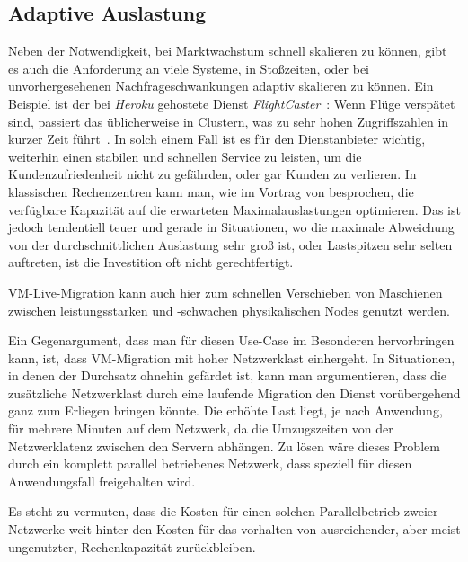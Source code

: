 \subsection{Adaptive Auslastung}
\label{sec:adaptive-auslastung}
Neben der Notwendigkeit, bei Marktwachstum schnell skalieren zu
können, gibt es auch die Anforderung an viele Systeme, in Stoßzeiten,
oder bei unvorhergesehenen Nachfrageschwankungen adaptiv skalieren zu
können. Ein Beispiel ist der bei \emph{Heroku} gehostete Dienst
\emph{FlightCaster}~\cite{flightcaster}: Wenn Flüge verspätet sind,
passiert das üblicherweise in Clustern, was zu sehr hohen
Zugriffszahlen in kurzer Zeit führt~\cite{flightcaster_success}. In
solch einem Fall ist es für den Dienstanbieter wichtig, weiterhin
einen stabilen und schnellen Service zu leisten, um die
Kundenzufriedenheit nicht zu gefährden, oder gar Kunden zu
verlieren. In klassischen Rechenzentren kann man, wie im Vortrag von
\cite{benchmarkingthecloud} besprochen, die verfügbare Kapazität auf
die erwarteten Maximalauslastungen optimieren. Das ist jedoch
tendentiell teuer und gerade in Situationen, wo die maximale
Abweichung von der durchschnittlichen Auslastung sehr groß ist, oder
Lastspitzen sehr selten auftreten, ist die Investition oft nicht
gerechtfertigt.

VM-Live-Migration kann auch hier zum schnellen Verschieben von
Maschienen zwischen leistungsstarken und -schwachen physikalischen
Nodes genutzt werden.

Ein Gegenargument, dass man für diesen Use-Case im Besonderen
hervorbringen kann, ist, dass VM-Migration mit hoher Netzwerklast
einhergeht. In Situationen, in denen der Durchsatz ohnehin gefärdet
ist, kann man argumentieren, dass die zusätzliche Netzwerklast durch
eine laufende Migration den Dienst vorübergehend ganz zum Erliegen
bringen könnte. Die erhöhte Last liegt, je nach Anwendung, für mehrere
Minuten auf dem Netzwerk, da die Umzugszeiten von der Netzwerklatenz
zwischen den Servern abhängen. Zu lösen wäre dieses Problem durch ein
komplett parallel betriebenes Netzwerk, dass speziell für diesen
Anwendungsfall freigehalten wird.

Es steht zu vermuten, dass die Kosten für einen solchen
Parallelbetrieb zweier Netzwerke weit hinter den Kosten für das
vorhalten von ausreichender, aber meist ungenutzter, Rechenkapazität
zurückbleiben.

